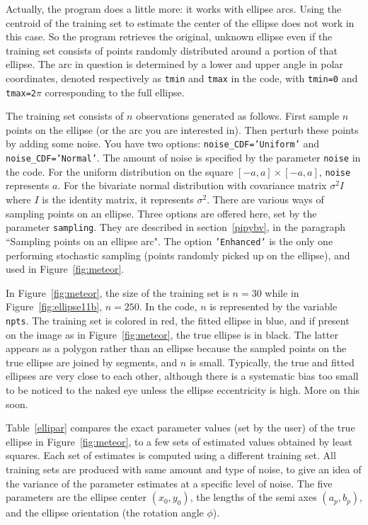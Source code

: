 \documentclass[oneside,10pt]{book}
\begin{document}
Actually, the program does a little more: it works with ellipse arcs. Using the centroid of the training set to estimate the center of the ellipse does not work in this case. So the program retrieves the original, unknown ellipse even if the training set consists of points randomly distributed around a portion of that ellipse. The arc in question is determined by a lower and upper angle in polar coordinates,
 denoted respectively as \texttt{tmin} and \texttt{tmax} in the code, with \texttt{tmin=0} and \texttt{tmax=2$\pi$} corresponding to the full ellipse.

The training set consists of $n$ observations generated as follows.
First sample $n$ points on the ellipse (or the arc you are interested in). Then perturb these points by adding some noise. You have two options:
 \texttt{noise\_CDF='Uniform'} and \texttt{noise\_CDF='Normal'}. The amount of noise is specified by the parameter
 \texttt{noise} in the code. For the uniform distribution on the square $[-a,a] \times [-a,a ]$, \texttt{noise} represents $a$. For the bivariate normal distribution with covariance matrix $\sigma^2 I$ where $I$ is the identity matrix, it represents $\sigma^2$. There are various ways of sampling points on an ellipse. Three options are offered here, set by the parameter \texttt{sampling}.
They are described in section~\ref{pipybv}, in the paragraph ``Sampling points on an ellipse arc". The option \texttt{'Enhanced'} is the only one performing  stochastic sampling (points randomly picked up on the ellipse), and used in Figure~\ref{fig:meteor}.


In Figure~\ref{fig:meteor}, the size of the training set is $n=30$ while in Figure~\ref{fig:ellipse11b}, $n=250$. In the code, $n$ is represented by the variable \texttt{npts}. The training set is colored in red, the fitted ellipse in blue, and if present on the image as in Figure~\ref{fig:meteor}, the
 true ellipse is in black. The latter appears as a polygon rather than an ellipse because the sampled points on the true ellipse are joined by segments,
 and $n$ is small. Typically, the true and fitted ellipses are very close to each other, although there is a systematic bias too small to be noticed to the naked eye unless the ellipse eccentricity is high. More on this soon.

Table~\ref{ellipar} compares the exact parameter values (set by the user) of the true ellipse in
 Figure~\ref{fig:meteor},  to a few sets of estimated values obtained by least squares. Each set of estimates is computed using
 a different training set. All training sets are produced with same amount and type of noise, to give an idea of the variance of the parameter estimates
 at a specific level of noise.  The five parameters are the ellipse center $(x_0,y_0)$, the lengths of the semi axes $(a_p, b_p)$, and the ellipse orientation
 (the rotation angle $\phi$).
\end{document}
